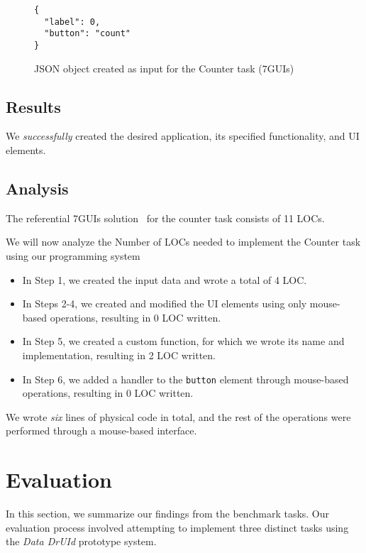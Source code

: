 \begin{figure}[htbp]
	\caption{JSON object created as input for the Counter task (7GUIs)}
	\label{fig:temp-json}
	\begin{lstlisting}
{
  "label": 0,
  "button": "count"
}
    \end{lstlisting}
\end{figure}

\subsection{Results}
We \emph{successfully} created the desired application, its specified functionality, and UI elements.

\subsection{Analysis}
The referential 7GUIs solution~\cite{7guis-React-TypeScript-MobX/src/app/guis/counter.tsx} for the counter task consists of 11 LOCs.

We will now analyze the Number of LOCs needed to implement the Counter task using our programming system
\begin{itemize}
	\item In Step 1, we created the input data and wrote a total of 4 LOC.
	\item   In Steps 2-4, we created and modified the UI elements using only mouse-based operations, resulting in 0 LOC written.
	\item   In Step 5, we created a custom function, for which we wrote its name and implementation, resulting in 2 LOC written.
	\item   In Step 6, we added a handler to the \texttt{button} element through mouse-based operations, resulting in 0 LOC written.
\end{itemize}
We wrote \emph{six} lines of physical code in total, and the rest of the operations were performed through a mouse-based interface.
\section{Evaluation}
In this section, we summarize our findings from the benchmark tasks.
Our evaluation process involved attempting to implement three distinct tasks using the \emph{Data DrUId} prototype system.


